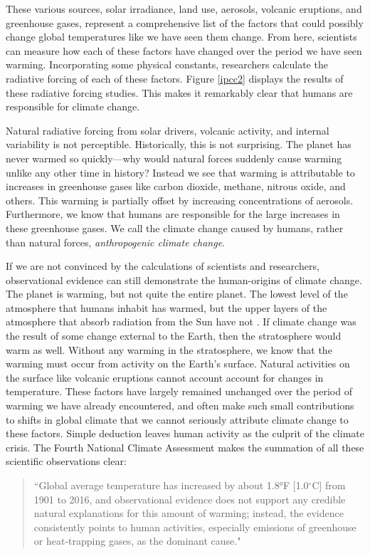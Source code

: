 These various sources, solar irradiance, land use, aerosols, volcanic eruptions, and greenhouse gases, represent a comprehensive list of the factors that could possibly change global temperatures like we have seen them change. From here, scientists can measure how each of these factors have changed over the period we have seen warming. Incorporating some physical constants, researchers calculate the radiative forcing of each of these factors. Figure \ref{ipcc2} displays the results of these radiative forcing studies. This makes it remarkably clear that humans are responsible for climate change. 

Natural radiative forcing from solar drivers, volcanic activity, and internal variability is not perceptible. Historically, this is not surprising. The planet has never warmed so quickly---why would natural forces suddenly cause warming unlike any other time in history? Instead we see that warming is attributable to increases in greenhouse gases like carbon dioxide, methane, nitrous oxide, and others. This warming is partially offset by increasing concentrations of aerosols. Furthermore, we know that humans are responsible for the large increases in these greenhouse gases. We call the climate change caused by humans, rather than natural forces, \emph{anthropogenic climate change}.

If we are not convinced by the calculations of scientists and researchers, observational evidence can still demonstrate the human-origins of climate change. The planet is warming, but not quite the entire planet. The lowest level of the atmosphere that humans inhabit has warmed, but the upper layers of the atmosphere that absorb radiation from the Sun have not \citep{C2ES}. If climate change was the result of some change external to the Earth, then the stratosphere would warm as well. Without any warming in the stratosphere, we know that the warming must occur from activity on the Earth's surface. Natural activities on the surface like volcanic eruptions cannot account account for changes in temperature. These factors have largely remained unchanged over the period of warming we have already encountered, and often make such small contributions to shifts in global climate that we cannot seriously attribute climate change to these factors. Simple deduction leaves human activity as the culprit of the climate crisis. The Fourth National Climate Assessment makes the summation of all these scientific observations clear:
\begin{quote}
``Global average temperature has increased by about 1.8°F [1.0$^\circ$C] from 1901 to 2016, and observational evidence does not support any credible natural explanations for this amount of warming; instead, the evidence consistently points to human activities, especially emissions of greenhouse or heat-trapping gases, as the dominant cause." \citep{nationalar4}
\end{quote}



